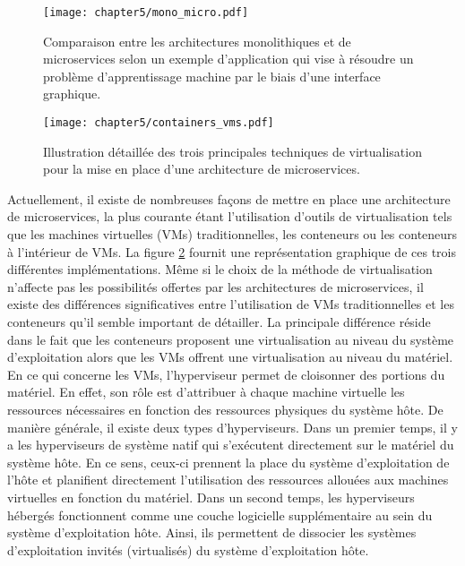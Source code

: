 \begin{figure}[t]
	\centering
	\texttt{[image: chapter5/mono\_micro.pdf]}
		\caption{Comparaison entre les architectures monolithiques et de microservices selon un exemple d'application qui vise à résoudre un problème d'apprentissage machine par le biais d'une interface graphique.}
	\label{fig:mono_micro}
\end{figure}

\begin{figure}[hb!]
	\centering
	\texttt{[image: chapter5/containers\_vms.pdf]}
		\caption{Illustration détaillée des trois principales techniques de virtualisation pour la mise en place d'une architecture de microservices.}
	\label{fig:containers_vms}
\end{figure}

Actuellement, il existe de nombreuses façons de mettre en place une architecture de microservices, la plus courante étant l'utilisation d'outils de virtualisation tels que les machines virtuelles (\acsp{VM}) traditionnelles, les conteneurs ou les conteneurs à l'intérieur de \acsp{VM}. La figure \ref{fig:containers_vms} fournit une représentation graphique de ces trois différentes implémentations. Même si le choix de la méthode de virtualisation n'affecte pas les possibilités offertes par les architectures de microservices, il existe des différences significatives entre l'utilisation de \acsp{VM} traditionnelles et les conteneurs qu'il semble important de détailler. La principale différence réside dans le fait que les conteneurs proposent une virtualisation au niveau du système d'exploitation alors que les \acsp{VM} offrent une virtualisation au niveau du matériel. En ce qui concerne les \acsp{VM}, l'hyperviseur permet de cloisonner des portions du matériel. En effet, son rôle est d'attribuer à chaque machine virtuelle les ressources nécessaires en fonction des ressources physiques du système hôte. De manière générale, il existe deux types d'hyperviseurs. Dans un premier temps, il y a les hyperviseurs de système natif qui s'exécutent directement sur le matériel du système hôte. En ce sens, ceux-ci prennent la place du système d'exploitation de l'hôte et planifient directement l'utilisation des ressources allouées aux machines virtuelles en fonction du matériel. Dans un second temps, les hyperviseurs hébergés fonctionnent comme une couche logicielle supplémentaire au sein du système d'exploitation hôte. Ainsi, ils permettent de dissocier les systèmes d'exploitation invités (virtualisés) du système d'exploitation hôte.

